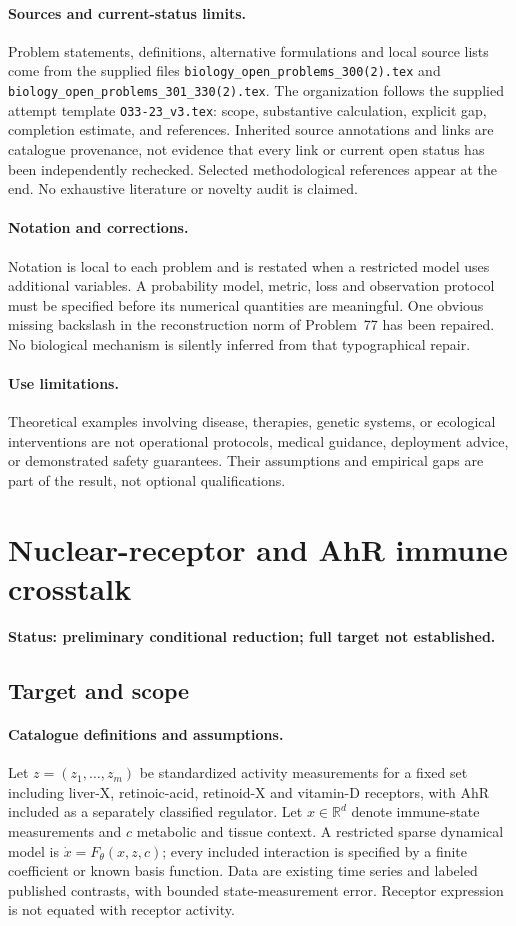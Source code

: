 \documentclass[11pt]{article}
\begin{document}
\paragraph{Sources and current-status limits.}
Problem statements, definitions, alternative formulations and local source lists
come from the supplied files
\texttt{biology\_open\_problems\_300(2).tex} and
\texttt{biology\_open\_problems\_301\_330(2).tex}.
The organization follows the supplied attempt template
\texttt{O33-23\_v3.tex}: scope, substantive calculation, explicit gap,
completion estimate, and references. Inherited source annotations and links are
catalogue provenance, not evidence that every link or current open status has
been independently rechecked. Selected methodological references appear at the
end. No exhaustive literature or novelty audit is claimed.

\paragraph{Notation and corrections.}
Notation is local to each problem and is restated when a restricted model uses
additional variables. A probability model, metric, loss and observation protocol
must be specified before its numerical quantities are meaningful. One obvious
missing backslash in the reconstruction norm of Problem~77 has been repaired.
No biological mechanism is silently inferred from that typographical repair.

\paragraph{Use limitations.}
Theoretical examples involving disease, therapies, genetic systems, or ecological
interventions are not operational protocols, medical guidance, deployment advice,
or demonstrated safety guarantees. Their assumptions and empirical gaps are part
of the result, not optional qualifications.


\section*{Nuclear-receptor and AhR immune crosstalk}
\label{prob:226}
\noindent\textbf{Status: preliminary conditional reduction; full target not established.}
\subsection{Target and scope}
\paragraph{Catalogue definitions and assumptions.}
Let $z=(z_1,\ldots,z_m)$ be standardized activity measurements for a fixed set including liver-X, retinoic-acid, retinoid-X and vitamin-D receptors, with AhR included as a separately classified regulator. Let $x\in\mathbb{R}^d$ denote immune-state measurements and $c$ metabolic and tissue context. A restricted sparse dynamical model is $\dot x=F_\theta(x,z,c)$; every included interaction is specified by a finite coefficient or known basis function. Data are existing time series and labeled published contrasts, with bounded state-measurement error. Receptor expression is not equated with receptor activity.
\end{document}
